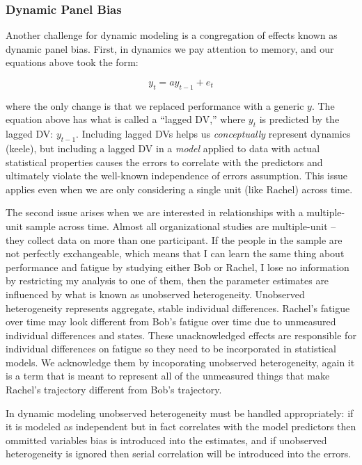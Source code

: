 \documentclass[english,,man]{apa6}
\theoremstyle{definition}
\theoremstyle{definition}
\theoremstyle{definition}
\theoremstyle{remark}
\begin{document}
\hypertarget{dynamic-panel-bias}{%
\subsubsection{Dynamic Panel Bias}\label{dynamic-panel-bias}}

Another challenge for dynamic modeling is a congregation of effects
known as dynamic panel bias. First, in dynamics we pay attention to
memory, and our equations above took the form:

\begin{equation}
y_{t} = a y_{t-1} + e_{t}
\end{equation}

\noindent where the only change is that we replaced performance with a
generic \(y\). The equation above has what is called a \enquote{lagged
DV,} where \(y_{t}\) is predicted by the lagged DV: \(y_{t-1}\).
Including lagged DVs helps us \emph{conceptually} represent dynamics
(keele), but including a lagged DV in a \emph{model} applied to data
with actual statistical properties causes the errors to correlate with
the predictors and ultimately violate the well-known independence of
errors assumption. This issue applies even when we are only considering
a single unit (like Rachel) across time.

The second issue arises when we are interested in relationships with a
multiple-unit sample across time. Almost all organizational studies are
multiple-unit -- they collect data on more than one participant. If the
people in the sample are not perfectly exchangeable, which means that I
can learn the same thing about performance and fatigue by studying
either Bob or Rachel, I lose no information by restricting my analysis
to one of them, then the parameter estimates are influenced by what is
known as unobserved heterogeneity. Unobserved heterogeneity represents
aggregate, stable individual differences. Rachel's fatigue over time may
look different from Bob's fatigue over time due to unmeasured individual
differences and states. These unacknowledged effects are responsible for
individual differences on fatigue so they need to be incorporated in
statistical models. We acknowledge them by incoporating unobserved
heterogeneity, again it is a term that is meant to represent all of the
unmeasured things that make Rachel's trajectory different from Bob's
trajectory.

In dynamic modeling unobserved heterogeneity must be handled
appropriately: if it is modeled as independent but in fact correlates
with the model predictors then ommitted variables bias is introduced
into the estimates, and if unobserved heterogeneity is ignored then
serial correlation will be introduced into the errors.
\end{document}
